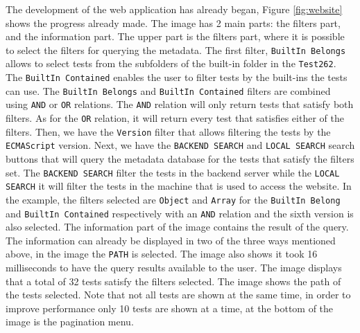 \documentclass[runningheads]{llncs}
\begin{document}
The development of the web application has already began, Figure \ref{fig:website} shows the progress already made. The image has 2 main parts: the filters part, and the information part.
%
The upper part is the filters part, where it is possible to select the filters for querying the metadata. The first filter, \texttt{BuiltIn Belongs} allows to select tests from the subfolders of the built-in folder in the \texttt{Test262}. The \texttt{BuiltIn Contained} enables the user to filter tests by the built-ins the tests can use.
%
The \texttt{BuiltIn Belongs} and \texttt{BuiltIn Contained} filters are combined using \texttt{AND} or \texttt{OR} relations. The \texttt{AND} relation will only return tests that satisfy both filters. As for the \texttt{OR} relation, it will return every test that satisfies either of the filters.
%
Then, we have the \texttt{Version} filter that allows filtering the tests by the \texttt{ECMAScript} version. Next, we have the \texttt{BACKEND SEARCH} and \texttt{LOCAL SEARCH} search buttons that will query the metadata database for the tests that satisfy the filters set. The \texttt{BACKEND SEARCH} filter the tests in the backend server while the \texttt{LOCAL SEARCH} it will filter the tests in the machine that is used to access the website.
%
In the example, the filters selected are \texttt{Object}  and \texttt{Array} for the \texttt{BuiltIn Belong} and \texttt{BuiltIn Contained} respectively with an \texttt{AND} relation and the sixth version is also selected.
%
The information part of the image contains the result of the query. The information can already be displayed in two of the three ways mentioned above, in the image the \texttt{PATH} is selected. The image also shows it took 16 milliseconds to have the query results available to the user. The image displays that a total of 32 tests satisfy the filters selected. The image shows the path of the tests selected. Note that not all tests are shown at the same time, in order to improve performance only 10 tests are shown at a time, at the bottom of the image is the pagination menu.
\end{document}
